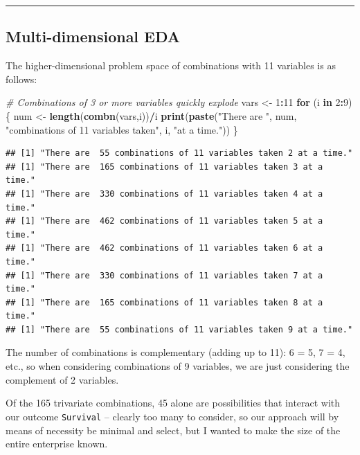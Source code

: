 \documentclass[]{article}
\newenvironment{Shaded}{\begin{snugshade}}{\end{snugshade}}
\newcommand{\KeywordTok}[1]{\textcolor[rgb]{0.13,0.29,0.53}{\textbf{#1}}}
\newcommand{\DecValTok}[1]{\textcolor[rgb]{0.00,0.00,0.81}{#1}}
\newcommand{\StringTok}[1]{\textcolor[rgb]{0.31,0.60,0.02}{#1}}
\newcommand{\CommentTok}[1]{\textcolor[rgb]{0.56,0.35,0.01}{\textit{#1}}}
\newcommand{\ControlFlowTok}[1]{\textcolor[rgb]{0.13,0.29,0.53}{\textbf{#1}}}
\newcommand{\OperatorTok}[1]{\textcolor[rgb]{0.81,0.36,0.00}{\textbf{#1}}}
\newcommand{\NormalTok}[1]{#1}
\begin{document}
\begin{center}\rule{0.5\linewidth}{\linethickness}\end{center}

\subsection{Multi-dimensional EDA}\label{multi-dimensional-eda}

The higher-dimensional problem space of combinations with 11 variables
is as follows:

\begin{Shaded}
\begin{Highlighting}[]
\CommentTok{# Combinations of 3 or more variables quickly explode}
\NormalTok{vars <-}\StringTok{ }\DecValTok{1}\OperatorTok{:}\DecValTok{11}
\ControlFlowTok{for}\NormalTok{ (i }\ControlFlowTok{in} \DecValTok{2}\OperatorTok{:}\DecValTok{9}\NormalTok{) \{}
\NormalTok{    num <-}\StringTok{ }\KeywordTok{length}\NormalTok{(}\KeywordTok{combn}\NormalTok{(vars,i))}\OperatorTok{/}\NormalTok{i}
    \KeywordTok{print}\NormalTok{(}\KeywordTok{paste}\NormalTok{(}\StringTok{"There are "}\NormalTok{, num, }\StringTok{"combinations of 11 variables taken"}\NormalTok{, i, }\StringTok{"at a time."}\NormalTok{))}
\NormalTok{\}}
\end{Highlighting}
\end{Shaded}

\begin{verbatim}
## [1] "There are  55 combinations of 11 variables taken 2 at a time."
## [1] "There are  165 combinations of 11 variables taken 3 at a time."
## [1] "There are  330 combinations of 11 variables taken 4 at a time."
## [1] "There are  462 combinations of 11 variables taken 5 at a time."
## [1] "There are  462 combinations of 11 variables taken 6 at a time."
## [1] "There are  330 combinations of 11 variables taken 7 at a time."
## [1] "There are  165 combinations of 11 variables taken 8 at a time."
## [1] "There are  55 combinations of 11 variables taken 9 at a time."
\end{verbatim}

The number of combinations is complementary (adding up to 11): 6 = 5, 7
= 4, etc., so when considering combinations of 9 variables, we are just
considering the complement of 2 variables.

Of the 165 trivariate combinations, 45 alone are possibilities that
interact with our outcome \texttt{Survival} -- clearly too many to
consider, so our approach will by means of necessity be minimal and
select, but I wanted to make the size of the entire enterprise known.
\end{document}
